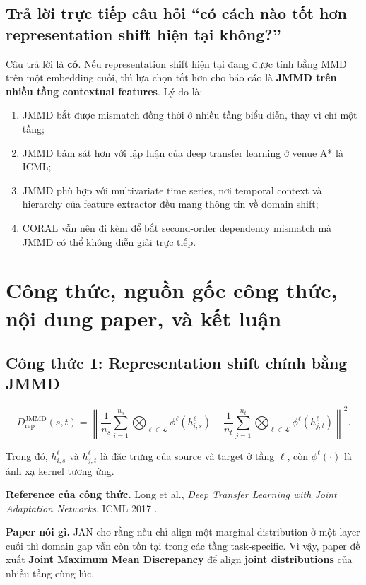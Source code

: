 \documentclass[a4paper]{article}
\begin{document}
\subsection{Trả lời trực tiếp câu hỏi ``có cách nào tốt hơn representation shift hiện tại không?''}

Câu trả lời là \textbf{có}. Nếu representation shift hiện tại đang được tính bằng MMD trên một embedding cuối, thì lựa chọn tốt hơn cho báo cáo là \textbf{JMMD trên nhiều tầng contextual features}. Lý do là:
\begin{enumerate}[label=\arabic*.]
    \item JMMD bắt được mismatch đồng thời ở nhiều tầng biểu diễn, thay vì chỉ một tầng;
    \item JMMD bám sát hơn với lập luận của deep transfer learning ở venue A* là ICML;
    \item JMMD phù hợp với multivariate time series, nơi temporal context và hierarchy của feature extractor đều mang thông tin về domain shift;
    \item CORAL vẫn nên đi kèm để bắt second-order dependency mismatch mà JMMD có thể không diễn giải trực tiếp.
\end{enumerate}

\section{Công thức, nguồn gốc công thức, nội dung paper, và kết luận}

\subsection{Công thức 1: Representation shift chính bằng JMMD}

\[
D_{\mathrm{rep}}^{\mathrm{JMMD}}(s,t)
= \left\|
\frac{1}{n_s}\sum_{i=1}^{n_s} \bigotimes_{\ell \in \mathcal{L}} \phi^{\ell}(h_{i,s}^{\ell})
-
\frac{1}{n_t}\sum_{j=1}^{n_t} \bigotimes_{\ell \in \mathcal{L}} \phi^{\ell}(h_{j,t}^{\ell})
\right\|^2.
\]

Trong đó, \(h_{i,s}^{\ell}\) và \(h_{j,t}^{\ell}\) là đặc trưng của source và target ở tầng \(\ell\), còn \(\phi^{\ell}(\cdot)\) là ánh xạ kernel tương ứng.

\textbf{Reference của công thức.} Long et al., \emph{Deep Transfer Learning with Joint Adaptation Networks}, ICML 2017 \cite{jan}.

\textbf{Paper nói gì.} JAN cho rằng nếu chỉ align một marginal distribution ở một layer cuối thì domain gap vẫn còn tồn tại trong các tầng task-specific. Vì vậy, paper đề xuất \textbf{Joint Maximum Mean Discrepancy} để align \textbf{joint distributions} của nhiều tầng cùng lúc.
\end{document}
